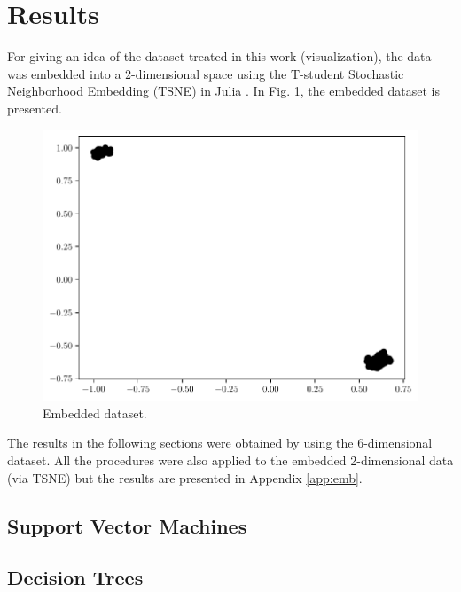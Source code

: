 \documentclass[conference]{IEEEtran}
\theoremstyle{definition}
\theoremstyle{remark}
\theoremstyle{remark}
\begin{document}
\section{Results}\label{sec:res}
For giving an idea of the dataset treated in this work (visualization), the data
was embedded into a 2-dimensional space using the T-student Stochastic
Neighborhood Embedding (TSNE) \href{https://github.com/lejon/TSne.jl}{in Julia}
\parencite{maaten2008}. In Fig. \ref{fig:emb_dat}, the embedded dataset is
presented.

\begin{figure}
  \includegraphics[width=\columnwidth]{figs/embedded-data.pdf}
  \caption{Embedded dataset.}
  \label{fig:emb_dat}
\end{figure}

The results in the following sections were obtained by using the 6-dimensional
dataset. All the procedures were also applied to the embedded 2-dimensional data
(via TSNE) but the results are presented in Appendix \ref{app:emb}.

\subsection{Support Vector Machines}


\subsection{Decision Trees}

\end{document}
